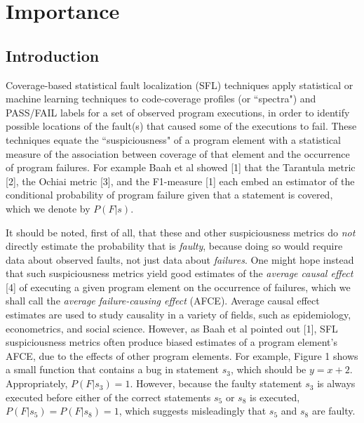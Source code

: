 \chapter{Importance}\label{chap:importance}

\section{Introduction}
Coverage-based statistical fault localization (SFL) techniques apply statistical or machine learning techniques to code-coverage profiles (or ``spectra") and PASS/FAIL labels for a set of observed program executions, in order to identify possible locations of the fault(s) that caused some of the executions to fail.  These techniques equate the ``suspiciousness" of a program element with a statistical measure of the association between coverage of that element and the occurrence of program failures.  For example Baah et al showed [1] that the Tarantula metric [2], the Ochiai metric [3], and the F1-measure [1] each embed an estimator of the conditional probability of program failure given that a statement  is covered, which we denote by $P(F|s)$.  

It should be noted, first of all, that these and other suspiciousness metrics do {\it not} directly estimate the probability that is {\it faulty}, because doing so would require data about observed faults, not just data about {\it failures}.  One might hope instead that such suspiciousness metrics yield good estimates of the {\it average causal effect} [4] of executing a given program element on the occurrence of failures, which we shall call the {\it average failure-causing effect} (AFCE).  Average causal effect estimates are used to study causality in a variety of fields, such as epidemiology, econometrics, and social science.  However, as Baah et al pointed out [1], SFL suspiciousness metrics often produce biased estimates of a program element’s AFCE, due to the effects of other program elements.  For example, Figure 1 shows a small function that contains a bug in statement $s_3$, which should be $y=x+2$.  Appropriately, $P(F|s_3)=1$.  However, because the faulty statement $s_3$ is always executed before either of the correct statements $s_5$ or $s_8$ is executed, $P(F|s_5)=P(F|s_8)=1$, which suggests misleadingly that $s_5$ and $s_8$ are faulty.





